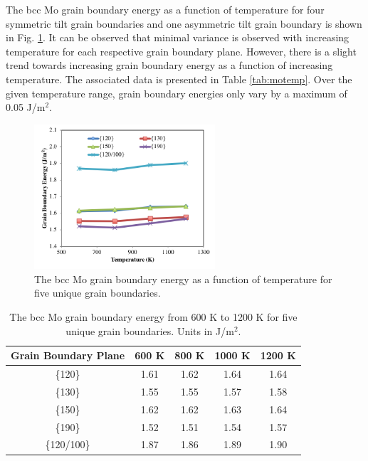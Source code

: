 \documentclass[review]{elsarticle}
\begin{document}
\FloatBarrier

The bcc Mo grain boundary energy as a function of temperature for four symmetric tilt grain boundaries and one asymmetric tilt grain boundary is shown in Fig. \ref{fig:motemp}. It can be observed that minimal variance is observed with increasing temperature for each respective grain boundary plane. However, there is a slight trend towards increasing grain boundary energy as a function of increasing temperature. The associated data is presented in Table \ref{tab:motemp}. Over the given temperature range, grain boundary energies only vary by a maximum of 0.05 J/m$^{2}$.

\begin{figure}[h]
 \centering
 \includegraphics[width=0.6\textwidth]{mo_temp.png}
 \caption{The bcc Mo grain boundary energy as a function of temperature for five unique grain boundaries.}
 \label{fig:motemp}
\end{figure}

\FloatBarrier

\begin{table}[h]
\caption{The bcc Mo grain boundary energy from 600 K to 1200 K for five unique grain boundaries. Units in J/m$^{2}$. } \label{tab:motemp}
\begin{center}
\begin{tabular}{|c|c|c|c|c|}
	\hline
	Grain Boundary Plane & 600 K & 800 K & 1000 K & 1200 K \\
	 \hline
	 \{120\} & 1.61 & 1.62 & 1.64 & 1.64 \\
	 \{130\} & 1.55 & 1.55 & 1.57 & 1.58 \\
	 \{150\} & 1.62 & 1.62 & 1.63 & 1.64 \\
	 \{190\} & 1.52 & 1.51 & 1.54 & 1.57 \\
	 \{120/100\} & 1.87 & 1.86 & 1.89 & 1.90 \\	 
	 \hline
\end{tabular}
\end{center}
\label{default}
\end{table}
\end{document}
